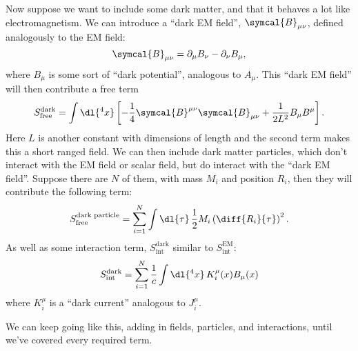 Now suppose we want to include some dark matter, and that it behaves a lot like electromagnetism.
We can introduce a \enquote{dark EM field}, \(\symcal{B}_{\mu\nu}\), defined analogously to the EM field:
\begin{equation}
    \symcal{B}_{\mu\nu} = \partial_\mu B_\nu - \partial_\nu B_\mu,
\end{equation}
where \(B_\mu\) is some sort of \enquote{dark potential}, analogous to \(A_\mu\).
This \enquote{dark EM field} will then contribute a free term
\begin{equation}
    S_{\text{free}}^{\text{dark}} = \int \dl{^4x} \left[ -\frac{1}{4}\symcal{B}^{\mu\nu}\symcal{B}_{\mu\nu} + \frac{1}{2L^2} B_\mu B^\mu \right].
\end{equation}
Here \(L\) is another constant with dimensions of length and the second term makes this a short ranged field.
We can then include dark matter particles, which don't interact with the EM field or scalar field, but do interact with the \enquote{dark EM field}.
Suppose there are \(N\) of them, with mass \(M_i\) and position \(R_i\), then they will contribute the following term:
\begin{equation}
    S_{\text{free}}^{\text{dark particle}} = \sum_{i = 1}^{N} \int \dl{\tau} \, \frac{1}{2}M_i \left( \diff{R_i}{\tau} \right)^2.
\end{equation}
As well as some interaction term, \(S_{\text{int}}^{\text{dark}}\) similar to \(S_{\text{int}}^{\text{EM}}\):
\begin{equation}
    S_{\text{int}}^{\text{dark}} = \sum_{i=1}^{N} \frac{1}{c} \int \dl{^4x} \, K_i^\mu(x)B_\mu(x)
\end{equation}
where \(K_i^\mu\) is a \enquote{dark current} analogous to \(J_i^\mu\).

We can keep going like this, adding in fields, particles, and interactions, until we've covered every required term.
